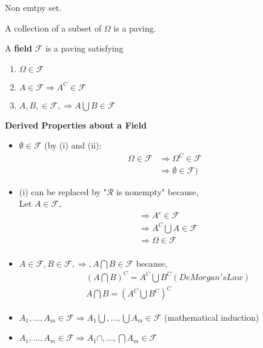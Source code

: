 \documentclass[11pt,fleqn]{book} %
\begin{document}
\begin{definition}[$\Omega$] Non emtpy set. 
	
\end{definition}

\begin{definition}[Paving] A collection of a subset of $\Omega$ is a paving. 
	
\end{definition}

\begin{definition}[Field] A \textbf{field} $\mathcal{F}$ is a paving satisfying
	\begin{enumerate}[label = (\roman*)]
		\item $\Omega \in \mathcal{F}$
		\item $A \in \mathcal{F} \Rightarrow A^C \in \mathcal{F}$
		\item $A, B, \in \mathcal{F}, \Rightarrow A \bigcup B \in \mathcal{F}$
	\end{enumerate}
	
\end{definition}

\textbf{Derived Properties about a Field }

\begin{itemize}
	\item $\emptyset \in \mathcal{F}$ 
		(by (i) and (ii): 
		\begin{align*}
			\Omega \in \mathcal{F} &\Rightarrow \Omega^C \in \mathcal{F}\\
			&\Rightarrow \emptyset \in \mathcal{F})
		\end{align*}
			
	\item (i) can be replaced by "$\mathcal{R}$ is nonempty" because,\\ 
		Let $A \in \mathcal{F}, $
			\begin{align*}
				&\Rightarrow A^c \in \mathcal{F}\\
			&\Rightarrow A^C \bigcup A \in \mathcal{F}\\
			&\Rightarrow \Omega \in \mathcal{F}\\
			\end{align*}
			
	\item $A \in \mathcal{F}, B \in \mathcal{F}, \Rightarrow, A\bigcap  B \in \mathcal{F}$ 
	because, \\
		\begin{align*}
		&(A\bigcap  B)^C = A^C \bigcup B^C (DeMorgan's Law)\\
		&A \bigcap  B = (A^C \bigcup B^C)^C	
		\end{align*}
		

	\item $A_1, \dots, A_m \in \mathcal{F} \Rightarrow A_1 \bigcup, \dots, \bigcup A_m \in \mathcal{F} $ (mathematical induction)
	\item$A_1, \dots, A_m \in \mathcal{F} \Rightarrow A_1 \cap, \dots, \bigcap  A_m \in \mathcal{F} $ 
\end{itemize}
\end{document}
